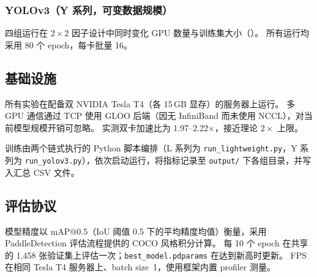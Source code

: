 \subsubsection{YOLOv3（Y 系列，可变数据规模）}

四组运行在 $2\!\times\!2$ 因子设计中同时变化 GPU 数量与训练集大小（）。
所有运行均采用 80 个 epoch，每卡批量 16。

\begin{table}[H]
\centering
\caption{YOLOv3 实验配置（Y 系列）。}
\label{tab:yolov3_config}
\end{table}

\subsection{基础设施}

所有实验在配备双 NVIDIA Tesla T4（各 15\,GB 显存）的服务器上运行。
多 GPU 通信通过 TCP 使用 GLOO 后端（因无 InfiniBand 而未使用 NCCL），对当前模型规模开销可忽略。
实测双卡加速比为 1.97--2.22$\times$，接近理论 $2\times$ 上限。

训练由两个链式执行的 Python 脚本编排（L 系列为 \texttt{run\_lightweight.py}，Y 系列为 \texttt{run\_yolov3.py}），依次启动运行，将指标记录至 \texttt{output/} 下各组目录，并写入汇总 CSV 文件。

\subsection{评估协议}

模型精度以 mAP@0.5（IoU 阈值 0.5 下的平均精度均值）衡量，采用 PaddleDetection 评估流程提供的 COCO 风格积分计算。
每 10 个 epoch 在共享的 1,458 张验证集上评估一次；\texttt{best\_model.pdparams} 在达到新高时更新。
FPS 在相同 Tesla T4 服务器上、batch size~1，使用框架内置 profiler 测量。
